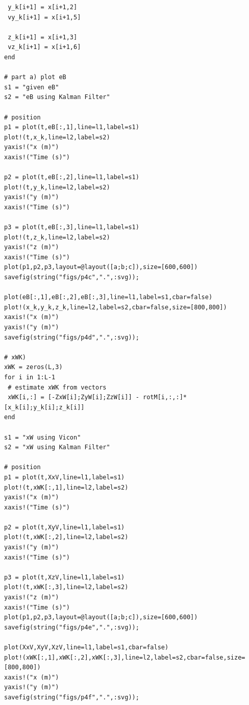\documentclass[paper=a4, fontsize=11pt]{scrartcl}
\numberwithin{equation}{section}		%
\numberwithin{figure}{section}			%
\numberwithin{table}{section}				%
\begin{document}
\begin{lstlisting}
 y_k[i+1] = x[i+1,2]
 vy_k[i+1] = x[i+1,5]

 z_k[i+1] = x[i+1,3]
 vz_k[i+1] = x[i+1,6]
end

# part a) plot eB
s1 = "given eB"
s2 = "eB using Kalman Filter"

# position
p1 = plot(t,eB[:,1],line=l1,label=s1)
plot!(t,x_k,line=l2,label=s2)
yaxis!("x (m)")
xaxis!("Time (s)")

p2 = plot(t,eB[:,2],line=l1,label=s1)
plot!(t,y_k,line=l2,label=s2)
yaxis!("y (m)")
xaxis!("Time (s)")

p3 = plot(t,eB[:,3],line=l1,label=s1)
plot!(t,z_k,line=l2,label=s2)
yaxis!("z (m)")
xaxis!("Time (s)")
plot(p1,p2,p3,layout=@layout([a;b;c]),size=[600,600])
savefig(string("figs/p4c",".",:svg));

plot(eB[:,1],eB[:,2],eB[:,3],line=l1,label=s1,cbar=false)
plot!(x_k,y_k,z_k,line=l2,label=s2,cbar=false,size=[800,800])
xaxis!("x (m)")
yaxis!("y (m)")
savefig(string("figs/p4d",".",:svg));

# xWK)
xWK = zeros(L,3)
for i in 1:L-1
 # estimate xWK from vectors
 xWK[i,:] = [-ZxW[i];ZyW[i];ZzW[i]] - rotM[i,:,:]*[x_k[i];y_k[i];z_k[i]]
end

s1 = "xW using Vicon"
s2 = "xW using Kalman Filter"

# position
p1 = plot(t,XxV,line=l1,label=s1)
plot!(t,xWK[:,1],line=l2,label=s2)
yaxis!("x (m)")
xaxis!("Time (s)")

p2 = plot(t,XyV,line=l1,label=s1)
plot!(t,xWK[:,2],line=l2,label=s2)
yaxis!("y (m)")
xaxis!("Time (s)")

p3 = plot(t,XzV,line=l1,label=s1)
plot!(t,xWK[:,3],line=l2,label=s2)
yaxis!("z (m)")
xaxis!("Time (s)")
plot(p1,p2,p3,layout=@layout([a;b;c]),size=[600,600])
savefig(string("figs/p4e",".",:svg));

plot(XxV,XyV,XzV,line=l1,label=s1,cbar=false)
plot!(xWK[:,1],xWK[:,2],xWK[:,3],line=l2,label=s2,cbar=false,size=[800,800])
xaxis!("x (m)")
yaxis!("y (m)")
savefig(string("figs/p4f",".",:svg));
\end{lstlisting}
\end{document}
